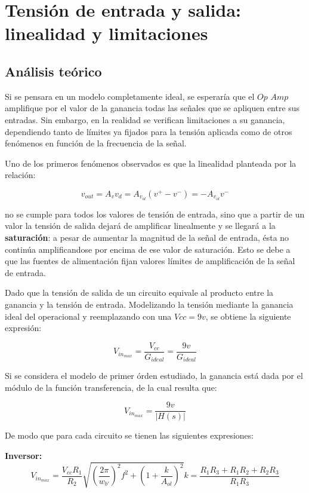 \section{Tensión de entrada y salida: linealidad y limitaciones}

\subsection{Análisis teórico}

Si se pensara en un modelo completamente ideal, se esperaría que el $Op$ $Amp$ amplifique por el valor de la ganancia todas las señales que se apliquen entre sus entradas. Sin embargo, en la realidad 
se verifican limitaciones a su ganancia, dependiendo tanto de límites ya fijados para la tensión aplicada como de otros fenómenos en función de la frecuencia de la señal.

Uno de los primeros fenómenos observados es que la linealidad planteada por la relación:

$$v_{out}=A_{v}v_{d}=A_{v_{ol}}(v^{+}-v^{-})=-A_{v_{ol}}v^{-}$$ 

no se cumple para todos los valores de tensión de entrada,
sino que a partir de un valor la tensión de salida dejará de amplificar linealmente y se llegará a la \textbf{saturación}: a pesar de aumentar la magnitud de la 
señal de entrada, ésta no continúa amplificandose por encima de ese valor de saturación. Esto se debe a que las fuentes de alimentación fijan valores límites de amplificación de la señal de entrada.

Dado que la tensión de salida de un circuito equivale al producto entre la ganancia y la tensión de entrada. Modelizando la tensión mediante la ganancia ideal del operacional y reemplazando con una $Vcc = 9v$, se obtiene la siguiente expresión:

$$V_{in_{max}}=\frac{V_{cc}}{G_{ideal}}=\frac{9v}{G_{ideal}}$$

Si se considera el modelo de primer órden estudiado, la ganancia está dada por el módulo de la función transferencia, de la cual resulta que:

$$V_{in_{max}}=\frac{9v}{\left | H(s) \right |}$$

De modo que para cada circuito se tienen las siguientes expresiones:

\textbf{Inversor:}
\begin{equation} \label{eq:sat1}
    V_{in_{max}}=\frac{V_{cc}R_{1}}{R_{2}}\sqrt{(\frac{2\pi}{w_{b'}})^{2}f^{2}+(1+\frac{k}{A_{ol}})^{2}}
    k=\frac{R_{1}R_{3}+R_{1}R_{2}+R_{2}R_{3}}{R_{1}R_{3}}
\end{equation}



